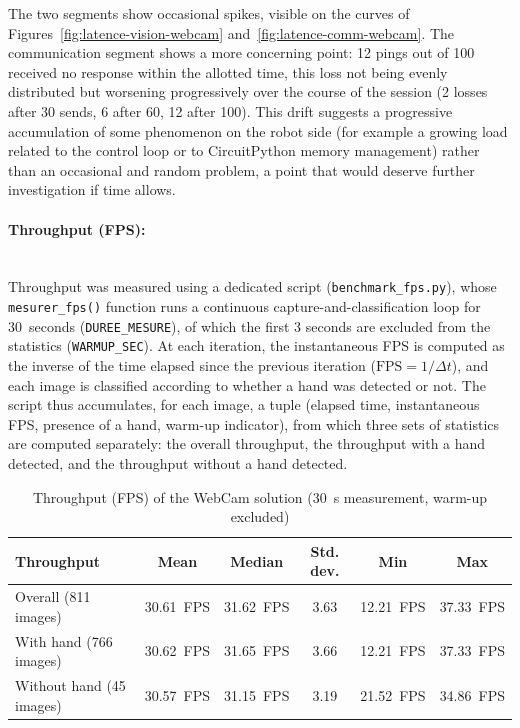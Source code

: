\documentclass[12pt,a4paper]{report}
\begin{document}
	The two segments show occasional spikes, visible on the curves of Figures~\ref{fig:latence-vision-webcam} and~\ref{fig:latence-comm-webcam}. The communication segment shows a more concerning point: 12 pings out of 100 received no response within the allotted time, this loss not being evenly distributed but worsening progressively over the course of the session (2 losses after 30 sends, 6 after 60, 12 after 100). This drift suggests a progressive accumulation of some phenomenon on the robot side (for example a growing load related to the control loop or to CircuitPython memory management) rather than an occasional and random problem, a point that would deserve further investigation if time allows.
	
	
	\paragraph{Throughput (FPS):} \mbox{} \\
	Throughput was measured using a dedicated script (\texttt{benchmark\_fps.py}), whose \texttt{mesurer\_fps()} function runs a continuous capture-and-classification loop for 30~seconds (\texttt{DUREE\_MESURE}), of which the first 3 seconds are excluded from the statistics (\texttt{WARMUP\_SEC}). At each iteration, the instantaneous FPS is computed as the inverse of the time elapsed since the previous iteration ($\text{FPS} = 1/\Delta t$), and each image is classified according to whether a hand was detected or not. The script thus accumulates, for each image, a tuple (elapsed time, instantaneous FPS, presence of a hand, warm-up indicator), from which three sets of statistics are computed separately: the overall throughput, the throughput with a hand detected, and the throughput without a hand detected.
	
	\begin{table}[H]
		\centering
		\small
		\begin{tabular}{lccccc}
			\toprule
			\textbf{Throughput} & \textbf{Mean} & \textbf{Median} & \textbf{Std. dev.} & \textbf{Min} & \textbf{Max} \\
			\midrule
			Overall (811 images) & 30.61~FPS & 31.62~FPS & 3.63 & 12.21~FPS & 37.33~FPS \\
			With hand (766 images) & 30.62~FPS & 31.65~FPS & 3.66 & 12.21~FPS & 37.33~FPS \\
			Without hand (45 images) & 30.57~FPS & 31.15~FPS & 3.19 & 21.52~FPS & 34.86~FPS \\
			\bottomrule
		\end{tabular}
		\caption{Throughput (FPS) of the WebCam solution (30~s measurement, warm-up excluded)}
		\label{tab:fps-webcam}
	\end{table}
	
\end{document}
